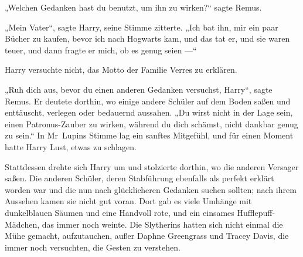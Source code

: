 „Welchen Gedanken hast du benutzt, um ihn zu wirken?“ sagte Remus.

„Mein Vater“, sagte Harry, seine Stimme zitterte.
„Ich bat ihn, mir ein paar Bücher zu kaufen, bevor ich nach Hogwarts kam, und das tat er, und sie waren teuer, und dann fragte er mich, ob es genug seien —“

Harry versuchte nicht, das Motto der Familie Verres zu erklären.

„Ruh dich aus, bevor du einen anderen Gedanken versuchst, Harry“, sagte Remus. Er deutete dorthin, wo einige andere Schüler auf dem Boden saßen und enttäuscht, verlegen oder bedauernd aussahen.
„Du wirst nicht in der Lage sein, einen Patronus-Zauber zu wirken, während du dich schämst, nicht dankbar genug zu sein.“ In Mr~Lupins Stimme lag ein sanftes Mitgefühl, und für einen Moment hatte Harry Lust, etwas zu schlagen.

Stattdessen drehte sich Harry um und stolzierte dorthin, wo die anderen Versager saßen. Die anderen Schüler, deren Stabführung ebenfalls als perfekt erklärt worden war und die nun nach glücklicheren Gedanken suchen sollten; nach ihrem Aussehen kamen sie nicht gut voran. Dort gab es viele Umhänge mit dunkelblauen Säumen und eine Handvoll rote, und ein einsames Hufflepuff-Mädchen, das immer noch weinte. Die Slytherins hatten sich nicht einmal die Mühe gemacht, aufzutauchen, außer Daphne Greengrass und Tracey Davis, die immer noch versuchten, die Gesten zu verstehen.

